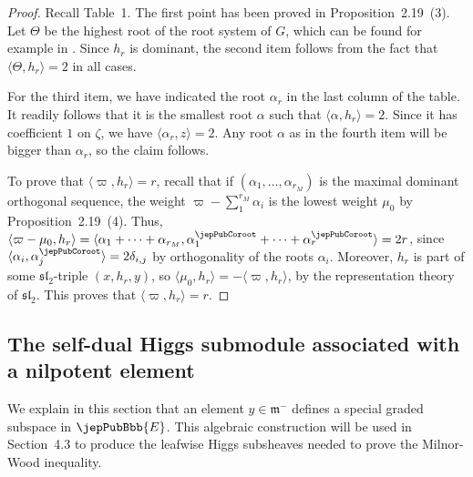 \begin{proof}
Recall Table~1. The first point has been proved in Proposition~2.19~(3). Let $\Theta$ be the highest root of the root system of $G$, which can be found for example in \cite{jep93Bou68}. Since $h_r$ is dominant, the second item follows from the fact that $\langle\Theta,h_r\rangle=2$ in all cases.

For the third item, we have indicated the root $\alpha_r$ in the last column of the table. It readily follows that it is the smallest root $\alpha$ such that $\langle\alpha,h_r\rangle=2$. Since it has coefficient $1$ on $\zeta$, we have $\langle\alpha_r,z\rangle=2$. Any root $\alpha$ as in the fourth item will be bigger than $\alpha_r$, so the claim follows.

To prove that $\langle\varpi,h_r\rangle=r$, recall that if $(\alpha_1,\ldots,\alpha_{r_M})$ is the maximal dominant orthogonal sequence, the weight $\varpi-\sum_{1}^{r_M}\alpha_i$ is the lowest weight $\mu_0$ by Proposition~2.19~(4). Thus, $\langle\varpi-\mu_0,h_r\rangle=\langle\alpha_1+\cdots+\alpha_{r_M},\alpha_1^\jepPubCoroot+\cdots+\alpha_r^\jepPubCoroot\rangle=2r$, since $\langle\alpha_i,\alpha_j^\jepPubCoroot\rangle=2\delta_{i,j}$ by orthogonality of the roots $\alpha_i$. Moreover, $h_r$ is part of some $\mathfrak{sl}_2$-triple $(x,h_r,y)$, so $\langle\mu_0,h_r\rangle=-\langle\varpi,h_r\rangle$, by the representation theory of $\mathfrak{sl}_2$. This proves that $\langle\varpi,h_r\rangle=r$.
\end{proof}

\subsection{The self-dual Higgs submodule associated with a nilpotent element}
We explain in this section that an element $y\in\mathfrak m^-$ defines a special graded subspace in $\jepPubBbb{E}$. This algebraic construction will be used in Section~4.3 to produce the leafwise Higgs subsheaves needed to prove the Milnor-Wood inequality.
